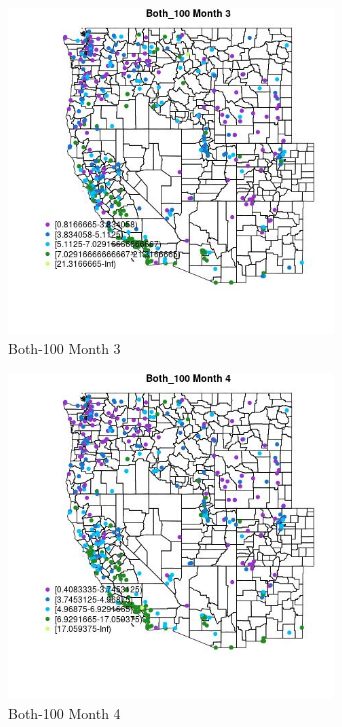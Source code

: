 \begin{figure} 
\centering  
\includegraphics[width=0.77\textwidth]{Code_Outputs/ML_input_report_ML_input_PM25_Step5_part_d_de_duplicated_aves_ML_input_MapObsMo3Both_100.jpg} 
\caption{\label{fig:ML_input_report_ML_input_PM25_Step5_part_d_de_duplicated_aves_ML_inputMapObsMo3Both_100}Both-100 Month 3} 
\end{figure} 
 

\clearpage 

\begin{figure} 
\centering  
\includegraphics[width=0.77\textwidth]{Code_Outputs/ML_input_report_ML_input_PM25_Step5_part_d_de_duplicated_aves_ML_input_MapObsMo4Both_100.jpg} 
\caption{\label{fig:ML_input_report_ML_input_PM25_Step5_part_d_de_duplicated_aves_ML_inputMapObsMo4Both_100}Both-100 Month 4} 
\end{figure} 
 

